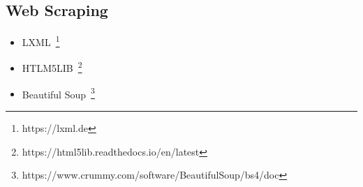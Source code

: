 \subsection*{Web Scraping}

\begin{itemize}
    \item LXML~\footnote{https://lxml.de}
    \item HTLM5LIB~\footnote{https://html5lib.readthedocs.io/en/latest}
    \item Beautiful Soup~\footnote{https://www.crummy.com/software/BeautifulSoup/bs4/doc}
\end{itemize}
